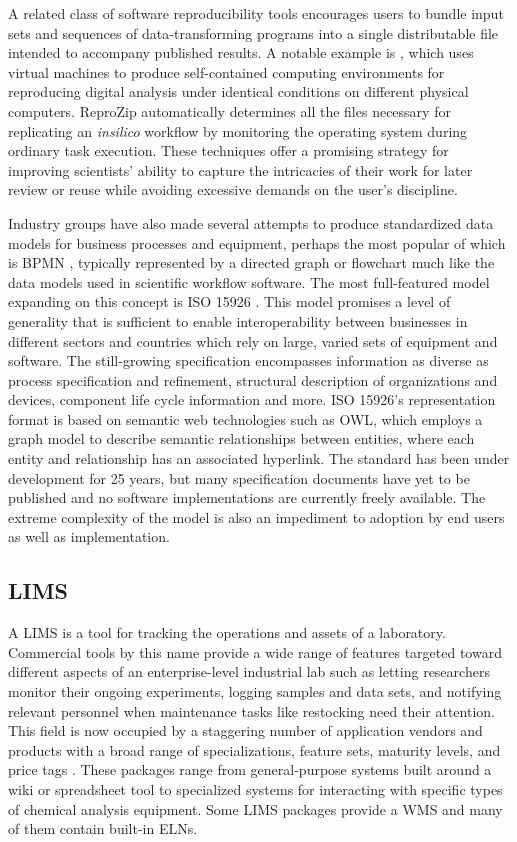 \documentclass[../thesis]{subfiles}
\begin{document}
A related class of software reproducibility tools encourages users to
bundle input sets and sequences of data-transforming programs into a
single distributable file intended to accompany published results.
A notable example is \cite{ReproZip}, which uses virtual machines to
produce self-contained computing environments for reproducing digital
analysis under identical conditions on different physical
computers. ReproZip automatically determines all the files necessary
for replicating an \textit{\gls{insilico}} workflow by monitoring the operating
system during ordinary task execution. These techniques offer a
promising strategy for improving scientists' ability to capture the
intricacies of their work for later review or reuse while avoiding
excessive demands on the user's discipline.

Industry groups have also made several attempts to produce
standardized data models for business processes and equipment, perhaps
the most popular of which is \gls{BPMN}
\cite{Allweyer:2010:BPM:1841147}, typically represented by a directed
graph or flowchart much like the data models used in scientific
workflow software. The
most full-featured model expanding on this concept is ISO 15926
\cite{West2009}. This model promises
a level of generality that is sufficient to enable interoperability
between businesses in different sectors and countries which rely on
large, varied sets of equipment and software. The still-growing
specification encompasses information as diverse as process
specification and refinement, structural description of organizations
and devices, component life cycle information and more. ISO 15926's
representation format is based on semantic web technologies such as OWL, which
employs a graph model to describe semantic relationships between
entities, where each entity and relationship has an associated
hyperlink. The standard has been under development for 25 years, but
many specification documents have yet to be published and no software
implementations are currently freely available. The extreme complexity
of the model is also an impediment to adoption by end users as well as
implementation.

\subsection{\Gls{LIMS}}
A \gls{LIMS} is a tool for tracking the operations and assets of a
laboratory. Commercial tools by this name provide a wide range of
features targeted toward different aspects of an enterprise-level
industrial lab such as letting researchers monitor their ongoing
experiments, logging samples and data sets, and notifying relevant
personnel when maintenance tasks like restocking need their
attention. This field is now occupied by a staggering number of
application vendors and products with a broad range of
specializations, feature sets, maturity levels, and price tags
\cite{LIMSWikiList}. These packages range from general-purpose systems
built around a wiki or spreadsheet tool to specialized systems for
interacting with specific types of chemical analysis equipment.  Some
\gls{LIMS} packages provide a \gls{WMS} and many of them contain
built-in \gls{ELN}s.
\end{document}
